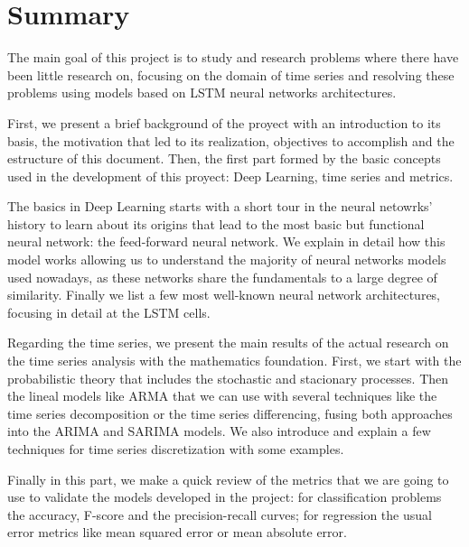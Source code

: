 %

\chapter*{Summary}\label{ch:summary}

The main goal of this project is to study and research problems where there have been little research on, focusing on the domain of time series and resolving these problems using models based on LSTM neural networks architectures.

First, we present a brief background of the proyect with an introduction to its basis, the motivation that led to its realization, objectives to accomplish and the estructure of this document. Then, the first part formed by the basic concepts used in the development of this proyect: Deep Learning, time series and metrics.

The basics in Deep Learning starts with a short tour in the neural netowrks' history to learn about its origins that lead to the most basic but functional neural network: the feed-forward neural network. We explain in detail how this model works allowing us to understand the majority of neural networks models used nowadays, as these networks share the fundamentals to a large degree of similarity. Finally we list a few most well-known neural network architectures, focusing in detail at the LSTM cells.

Regarding the time series, we present the main results of the actual research on the time series analysis with the mathematics foundation. First, we start with the probabilistic theory that includes the stochastic and stacionary processes. Then the lineal models like ARMA that we can use with several techniques like the time series decomposition or the time series differencing, fusing both approaches into the ARIMA and SARIMA models. We also introduce and explain a few techniques for time series discretization with some examples.

Finally in this part, we make a quick review of the metrics that we are going to use to validate the models developed in the project: for classification problems the accuracy, F-score and the precision-recall curves; for regression the usual error metrics like mean squared error or mean absolute error.

